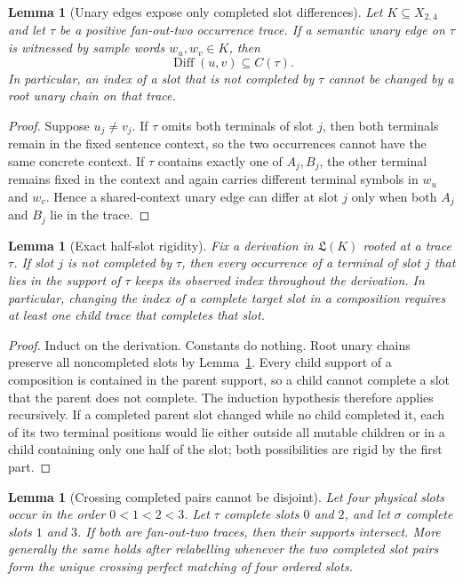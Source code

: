 \documentclass[11pt]{article}
\newtheorem{lemma}[definition]{Lemma}
\begin{document}
\begin{lemma}[Unary edges expose only completed slot differences]
\label{lem:unary-diff-completed}
Let $K\subseteq X_{2,4}$ and let $\tau$ be a positive fan-out-two occurrence
trace.  If a semantic unary edge on $\tau$ is witnessed by sample words
$w_u,w_v\in K$, then
\[
  \boxed{\operatorname{Diff}(u,v)\subseteq C(\tau).}
\]
In particular, an index of a slot that is not completed by $\tau$ cannot be
changed by a root unary chain on that trace.
\end{lemma}

\begin{proof}
Suppose $u_j\ne v_j$.  If $\tau$ omits both terminals of slot $j$, then both
terminals remain in the fixed sentence context, so the two occurrences cannot
have the same concrete context.  If $\tau$ contains exactly one of
$A_j,B_j$, the other terminal remains fixed in the context and again carries
different terminal symbols in $w_u$ and $w_v$.  Hence a shared-context unary
edge can differ at slot $j$ only when both $A_j$ and $B_j$ lie in the trace.
\end{proof}

\begin{lemma}[Exact half-slot rigidity]
\label{lem:exact-half-slot-rigidity}
Fix a derivation in $\mathfrak L(K)$ rooted at a trace $\tau$.  If slot $j$ is
not completed by $\tau$, then every occurrence of a terminal of slot $j$ that
lies in the support of $\tau$ keeps its observed index throughout the
derivation.  In particular, changing the index of a complete target slot in a
composition requires at least one child trace that completes that slot.
\end{lemma}

\begin{proof}
Induct on the derivation.  Constants do nothing.  Root unary chains preserve
all noncompleted slots by Lemma~\ref{lem:unary-diff-completed}.  Every child
support of a composition is contained in the parent support, so a child cannot
complete a slot that the parent does not complete.  The induction hypothesis
therefore applies recursively.  If a completed parent slot changed while no
child completed it, each of its two terminal positions would lie either outside
all mutable children or in a child containing only one half of the slot; both
possibilities are rigid by the first part.
\end{proof}

\begin{lemma}[Crossing completed pairs cannot be disjoint]
\label{lem:crossing-traces-intersect}
Let four physical slots occur in the order $0<1<2<3$.  Let $\tau$ complete
slots $0$ and $2$, and let $\sigma$ complete slots $1$ and $3$.  If both are
fan-out-two traces, then their supports intersect.
More generally the same holds after relabelling whenever the two completed
slot pairs form the unique crossing perfect matching of four ordered slots.
\end{lemma}
\end{document}
